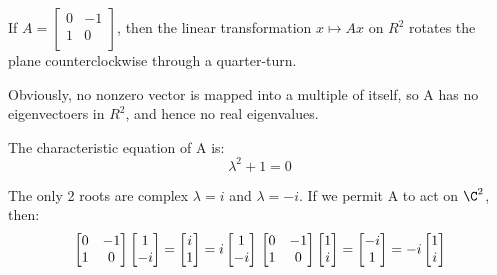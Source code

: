 \begin{eg}
    If \(A = \begin{bmatrix}
        0 &  -1 \\
        1 &  0 \\
    \end{bmatrix}\), then the linear transformation \(x \mapsto Ax\) on \(R^2\) rotates the plane counterclockwise through a quarter-turn. 

    Obviously, no nonzero vector is mapped into a multiple of itself, so A has no eigenvectoers in \(R^2\), and hence no real eigenvalues. 

    The characteristic equation of A is:
    \[
        \lambda^2 + 1 = 0
    \]

    The only 2 roots are complex \(\lambda = i\) and \(\lambda = -i\). If we permit A to act on \(\C^2\), then:
    \[
       \begin{bmatrix}
        0 &  -1 \\
        1 &  0 \\
       \end{bmatrix} 
       \begin{bmatrix}
         1 \\
         -i \\
       \end{bmatrix} 
        =
       \begin{bmatrix}
         i \\
         1 \\
       \end{bmatrix}
        =  
        i \begin{bmatrix}
             1 \\
             -i \\
        \end{bmatrix} \\
       \begin{bmatrix}
        0 &  -1 \\
        1 &  0 \\
       \end{bmatrix} 
       \begin{bmatrix}
         1 \\
         i \\
       \end{bmatrix} 
        =
       \begin{bmatrix}
         -i \\
         1 \\
       \end{bmatrix}
        =  
        -i \begin{bmatrix}
             1 \\
             i \\
        \end{bmatrix}
    \]   


\end{eg}
